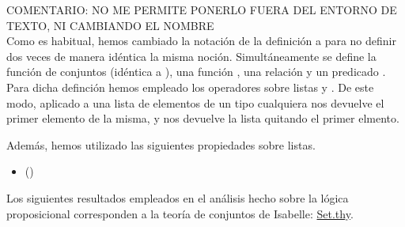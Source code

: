 \begin{isabellebody}
\begin{isamarkuptext}
COMENTARIO: NO ME PERMITE PONERLO FUERA DEL ENTORNO DE TEXTO, NI CAMBIANDO EL NOMBRE \\

Como es habitual, hemos cambiado la notación de la definición a  para no 
  definir dos veces de manera idéntica la misma noción. Simultáneamente se define la función
  de conjuntos  (idéntica a ), una función , una relación
   y un predicado . Para dicha definción hemos empleado los operadores
  sobre listas  y .
  De este modo,  aplicado a una lista de elementos de un tipo cualquiera  nos 
  devuelve el primer elemento de la misma, y   nos 
  devuelve la lista quitando el primer elmento.
 
  Además, hemos utilizado las siguientes propiedades sobre listas.

  \begin{itemize}
    \item[]  
    \hfill ()
  \end{itemize}%
\end{isamarkuptext}\isamarkuptrue%
%
\isadelimdocument
%
\endisadelimdocument
%
\isatagdocument
%
\isamarkuptrue%
%
\endisatagdocument
{\isafolddocument}%
%
\isadelimdocument
%
\endisadelimdocument
%
\begin{isamarkuptext}%
Los siguientes resultados empleados en el análisis hecho sobre la lógica proposicional 
  corresponden a la teoría de conjuntos de Isabelle: \href{https://n9.cl/qatp}{Set.thy}.


\end{isamarkuptext}
\end{isabellebody}
